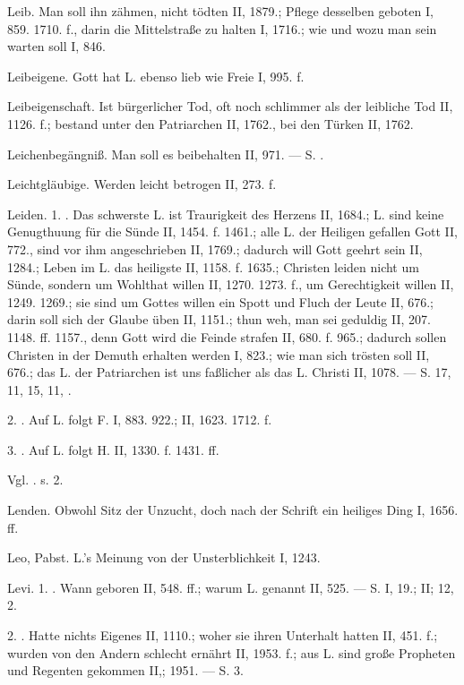 Leib. Man soll ihn zähmen, nicht tödten II, 1879.; Pflege desselben geboten I, 859. 1710. f., darin die Mittelstraße zu halten I, 1716.; wie und wozu man sein warten soll I, 846.

Leibeigene. Gott hat L. ebenso lieb wie Freie I, 995. f.

Leibeigenschaft. Ist bürgerlicher Tod, oft noch schlimmer als der leibliche Tod II, 1126. f.; bestand unter den Patriarchen II, 1762., bei den Türken II, 1762.

Leichenbegängniß. Man soll es beibehalten II, 971. — S. .

Leichtgläubige. Werden leicht betrogen II, 273. f.

Leiden. 1. . Das schwerste L. ist Traurigkeit des Herzens II, 1684.; L. sind keine Genugthuung für die Sünde II, 1454. f. 1461.; alle L. der Heiligen gefallen Gott II, 772., sind vor ihm angeschrieben II, 1769.; dadurch will Gott geehrt sein II, 1284.; Leben im L. das heiligste II, 1158. f. 1635.; Christen leiden nicht um Sünde, sondern um Wohlthat willen II, 1270. 1273. f., um Gerechtigkeit willen II, 1249. 1269.; sie sind um Gottes willen ein Spott und Fluch der Leute II, 676.; darin soll sich der Glaube üben II, 1151.; thun weh, man sei geduldig II, 207. 1148. ff. 1157., denn Gott wird die Feinde strafen II, 680. f. 965.; dadurch sollen Christen in der Demuth erhalten werden I, 823.; wie man sich trösten soll II, 676.; das L. der Patriarchen ist uns faßlicher als das L. Christi II, 1078. — S.  17,  11,  15,  11, .

2. . Auf L. folgt F. I, 883. 922.; II, 1623. 1712. f.

3. . Auf L. folgt H. II, 1330. f. 1431. ff.

Vgl. .  s.  2.

Lenden. Obwohl Sitz der Unzucht, doch nach der Schrift ein heiliges Ding I, 1656. ff.

Leo, Pabst. L.’s Meinung von der Unsterblichkeit I, 1243.

Levi. 1. . Wann geboren II, 548. ff.; warum L. genannt II, 525. — S.  I, 19.; II;  12,  2.

2. . Hatte nichts Eigenes II, 1110.; woher sie ihren Unterhalt hatten II, 451. f.; wurden von den Andern schlecht ernährt II, 1953. f.; aus L. sind große Propheten und Regenten gekommen II,; 1951. — S.  3.

